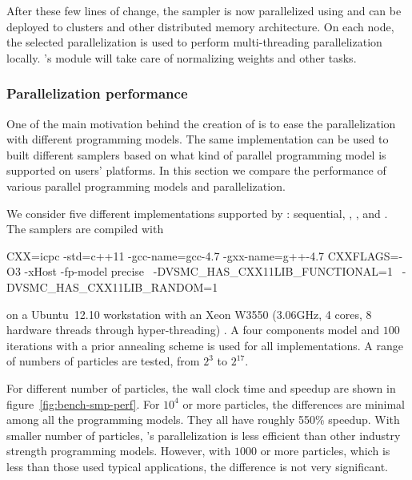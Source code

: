 \documentclass[11pt, bib, hyper, mint, minted=cache]{marticle}
\begin{document}
After these few lines of change, the sampler is now parallelized using \lmpi
and can be deployed to clusters and other distributed memory architecture. On
each node, the selected \smp parallelization is used to perform
multi-threading parallelization locally. \vsmc's \lmpi module will take care
of normalizing weights and other tasks.

\subsubsection{Parallelization performance}

One of the main motivation behind the creation of \vsmc is to ease the
parallelization with different programming models. The same implementation can
be used to built different samplers based on what kind of parallel programming
model is supported on users' platforms. In this section we compare the
performance of various \smp parallel programming models and \lopencl
parallelization.

We consider five different implementations supported by :
sequential, \ltbb, \lcilk, \lopenmp and \cppoo {}. The
samplers are compiled with
\begin{cppcode}
CXX=icpc -std=c++11 -gcc-name=gcc-4.7 -gxx-name=g++-4.7
CXXFLAGS=-O3 -xHost -fp-model precise  \
         -DVSMC_HAS_CXX11LIB_FUNCTIONAL=1  \
         -DVSMC_HAS_CXX11LIB_RANDOM=1
\end{cppcode}
on a Ubuntu~12.10 workstation with an Xeon W3550 (3.06GHz, 4 cores, 8 hardware
threads through hyper-threading) \cpu. A four components model and $100$
iterations with a prior annealing scheme is used for all implementations. A
range of numbers of particles are tested, from $2^3$ to $2^{17}$.

For different number of particles, the wall clock time and speedup are shown
in figure~\ref{fig:bench-smp-perf}. For $10^4$ or more particles, the
differences are minimal among all the programming models. They all have
roughly 550\% speedup. With smaller number of particles, \vsmc's \cppoo
parallelization is less efficient than other industry strength programming
models. However, with $1000$ or more particles, which is less than those used
typical applications, the difference is not very significant.
\end{document}
